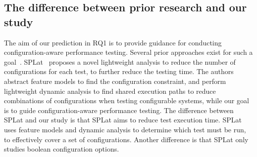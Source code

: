 \subsection{The difference between prior research and our study}
The aim of our prediction in RQ1 is to provide guidance for conducting configuration-aware performance testing. Several prior approaches exist for such a goal~\cite{DBLP:conf/sigsoft/KimMKBSBd13,DBLP:conf/icse/MedeirosKRGA16}. SPLat~\cite{DBLP:conf/sigsoft/KimMKBSBd13} proposes a novel lightweight analysis to reduce the number of configurations for each test, to further reduce the testing time. The authors abstract feature models to find the configuration constraint, and perform lightweight dynamic analysis to find shared execution paths to reduce combinations of configurations when testing configurable systems, while our goal is to guide configuration-aware performance testing. The difference between SPLat and our study is that SPLat aims to reduce test execution time. SPLat uses feature models and dynamic analysis to determine which test must be run, to effectively cover a set of configurations. Another difference is that SPLat only studies boolean configuration options. 

